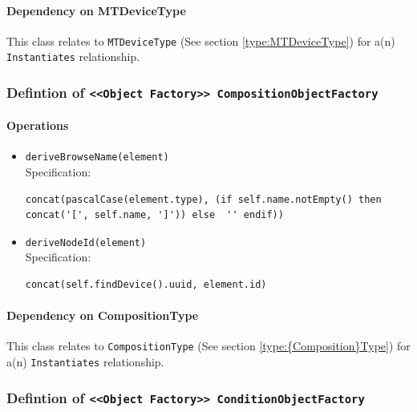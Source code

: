 \paragraph{Dependency on MTDeviceType}

This class relates to \texttt{MTDeviceType} (See section \ref{type:MTDeviceType}) for a(n) \texttt{Instantiates} relationship.

\FloatBarrier
\subsubsection{Defintion of \texttt{<<Object Factory>> CompositionObjectFactory}} \label{type:CompositionObjectFactory}

\FloatBarrier



\paragraph{Operations}
\begin{itemize}
  \item \texttt{deriveBrowseName(element)}\\
    Specification:
   \indent \begin{lstlisting}
concat(pascalCase(element.type), (if self.name.notEmpty() then concat('[', self.name, ']')) else  '' endif))
\end{lstlisting}

  \item \texttt{deriveNodeId(element)}\\
    Specification:
   \indent \begin{lstlisting}
concat(self.findDevice().uuid, element.id)
\end{lstlisting}

\end{itemize}
\paragraph{Dependency on {Composition}Type}

This class relates to \texttt{{Composition}Type} (See section \ref{type:{Composition}Type}) for a(n) \texttt{Instantiates} relationship.

\FloatBarrier
\subsubsection{Defintion of \texttt{<<Object Factory>> ConditionObjectFactory}} \label{type:ConditionObjectFactory}

